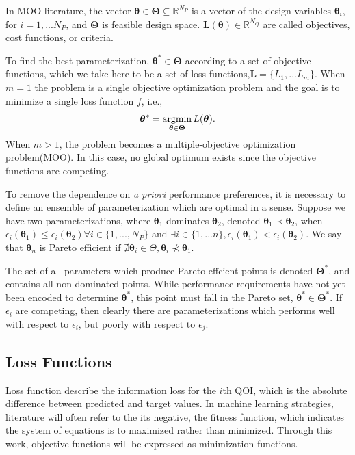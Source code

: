 In MOO literature, the vector $\bm{\theta} \in \bm{\Theta} \subseteq \mathbb{R}^{N_P}$ is a vector of the design variables $\bm{\theta}_i$, for $i=1,...N_P$, and $\bm{\Theta}$ is feasible design space.  $\bm{L}(\bm{\theta}) \in \mathbb{R}^{N_Q}$ are called objectives, cost functions, or criteria.

To find the best parameterization, $\bm{\theta}^* \in \bm{\Theta}$ according to a set of objective functions, which we take here to be a set of loss functions,$\bm{L}=\{L_1,...L_m\}$.  When $m=1$ the problem is a single objective optimization problem and the goal is to minimize a single loss function $f$, i.e.,
\begin{equation}
	\bm{\theta}^* = \operatorname*{argmin}_{\bm{\theta}\in\bm{\Theta}} L(\bm{\theta}).
\end{equation}
When $m>1$, the problem becomes a multiple-objective optimization problem(MOO).  In this case, no global optimum exists since the objective functions are competing.

To remove the dependence on \emph{a priori} performance preferences, it is necessary to define an ensemble of parameterization which are optimal in a sense.
Suppose we have two parameterizations,
where $\bm{\theta}_1$ dominates $\bm{\theta}_2$,
denoted $\bm{\theta}_1 \prec \bm{\theta}_2$,
when $\epsilon_i(\bm{\theta}_1) \leq \epsilon_i(\bm{\theta}_2) \forall i \in \{1,...,N_P\}$ and $\exists i \in \{1,...n\}, \epsilon_i(\bm{\theta}_1) < \epsilon_i(\bm{\theta}_2)$.
We say that $\bm{\theta}_n$ is Pareto efficient if $\nexists \bm{\theta}_i \in \Theta, \bm{\theta}_i \nprec \bm{\theta}_1$.

The set of all parameters which produce Pareto effcient points is denoted $\bm{\Theta}^*$, and contains all non-dominated points.  While performance requirements have not yet been encoded to determine $\bm{\theta}^*$, this point must fall in the Pareto set, $\bm{\theta}^* \in \bm{\Theta}^*$.  If $\epsilon_i$ are competing, then clearly there are parameterizations which performs well with respect to $\epsilon_i$, but poorly with respect to $\epsilon_j$.

\subsection{Loss Functions}
Loss function describe the information loss for the $i$th QOI, which is the absolute difference between predicted and target values.  In machine learning strategies, literature will often refer to the its negative, the fitness function, which indicates the system of equations is to maximized rather than minimized.  Through this work, objective functions will be expressed as minimization functions.

